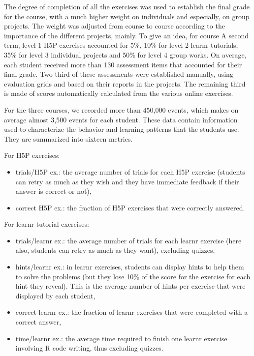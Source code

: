 \documentclass{aims}
\theoremstyle{definition}
\begin{document}
The degree of completion of all the exercises was used to establish the
final grade for the course, with a much higher weight on individuals and
especially, on group projects. The weight was adjusted from course to
course according to the importance of the different projects, mainly. To
give an idea, for course A second term, level 1 H5P exercises accounted
for 5\%, 10\% for level 2 learnr tutorials, 35\% for level 3 individual
projects and 50\% for level 4 group works. On average, each student
received more than 130 assessment items that accounted for their final
grade. Two third of these assessments were established manually, using
evaluation grids and based on their reports in the projects. The
remaining third is made of scores automatically calculated from the
various online exercises.

For the three courses, we recorded more than 450,000 events, which makes
on average almost 3,500 events for each student. These data contain
information used to characterize the behavior and learning patterns that
the students use. They are summarized into sixteen metrics.

For H5P exercises:

\begin{itemize}
\item
  trials/H5P ex.: the average number of trials for each H5P exercise
  (students can retry as much as they wish and they have immediate
  feedback if their answer is correct or not),
\item
  correct H5P ex.: the fraction of H5P exercises that were correctly
  answered.
\end{itemize}

For learnr tutorial exercises:

\begin{itemize}
\item
  trials/learnr ex.: the average number of trials for each learnr
  exercise (here also, students can retry as much as they want),
  excluding quizzes,
\item
  hints/learnr ex.: in learnr exercises, students can display hints to
  help them to solve the problems (but they lose 10\% of the score for
  the exercise for each hint they reveal). This is the average number of
  hints per exercise that were displayed by each student,
\item
  correct learnr ex.: the fraction of learnr exercises that were
  completed with a correct answer,
\item
  time/learnr ex.: the average time required to finish one learnr
  exercise involving R code writing, thus excluding quizzes.
\end{itemize}
\end{document}

